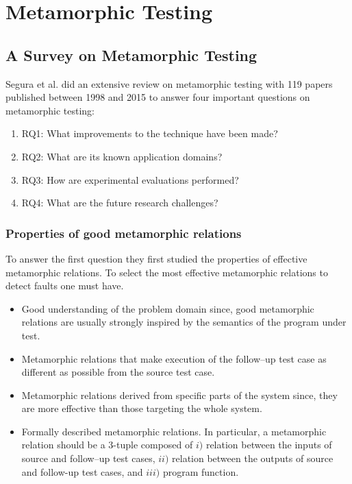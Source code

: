 \section{Metamorphic Testing}
	\subsection{A Survey on Metamorphic Testing \cite{Segura2016}}
		Segura et al. did an extensive review on metamorphic testing with 119 papers published between 1998 and 2015 to answer four important questions on metamorphic testing:
		\begin{enumerate}
			\item RQ1: What improvements to the technique have been made?
			\item RQ2: What are its known application domains?
			\item RQ3: How are experimental evaluations performed?
			\item RQ4: What are the future research challenges?
		\end{enumerate}
		\subsubsection{Properties of good metamorphic relations}
			To answer the first question they first studied the properties of effective metamorphic relations. To select the most effective metamorphic relations to detect faults one must have.
			\begin{itemize}
				\item Good understanding of the problem domain since, good metamorphic relations are usually strongly inspired by the semantics of the program under test.
				\item Metamorphic relations that make execution of the follow–up test case as different as possible from the source test case.
				\item Metamorphic relations derived from specific parts of the system since, they are more effective than those targeting the whole system.
				\item Formally described metamorphic relations. In particular, a metamorphic relation should be a 3-tuple composed of $i)$ relation between the inputs of source and follow–up test cases, $ii)$ relation between the outputs of source and follow-up test cases, and $iii)$ program function.
			\end{itemize}
